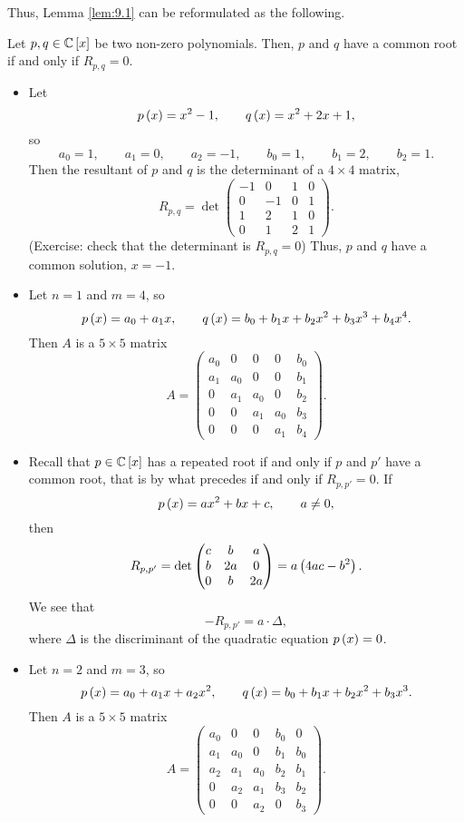 Thus, Lemma \ref{lem:9.1} can be reformulated as the following.

\begin{theorem}
\label{thm:9.3}
Let $ p, q \in \mathbb{C}\left[ x \right] $ be two non-zero polynomials. Then, $ p $ and $ q $ have a common root if and only if $ R_{p, q} = 0 $.
\end{theorem}

\begin{example}
\hfill
\begin{itemize}
\item Let
$$ p\left( x \right) = x^2 - 1, \qquad q\left( x \right) = x^2 + 2x + 1, $$
so
$$ a_0 = 1, \qquad a_1 = 0, \qquad a_2 = -1, \qquad b_0 = 1, \qquad b_1 = 2, \qquad b_2 = 1. $$
Then the resultant of $ p $ and $ q $ is the determinant of a $ 4 \times 4 $ matrix,
$$ R_{p, q} = \det
\begin{pmatrix}
-1 & 0 & 1 & 0 \\
0 & -1 & 0 & 1 \\
1 & 2 & 1 & 0 \\
0 & 1 & 2 & 1
\end{pmatrix}.
$$
(Exercise: check that the determinant is $ R_{p, q} = 0 $) Thus, $ p $ and $ q $ have a common solution, $ x = -1 $.
\item Let $ n = 1 $ and $ m = 4 $, so
$$ p\left( x \right) = a_0 + a_1x, \qquad q\left( x \right) = b_0 + b_1x + b_2x^2 + b_3x^3 + b_4x^4. $$
Then $ A $ is a $ 5 \times 5 $ matrix
$$ A =
\begin{pmatrix}
a_0 & 0 & 0 & 0 & b_0 \\
a_1 & a_0 & 0 & 0 & b_1 \\
0 & a_1 & a_0 & 0 & b_2 \\
0 & 0 & a_1 & a_0 & b_3 \\
0 & 0 & 0 & a_1 & b_4
\end{pmatrix}.
$$
\item Recall that $ p \in \mathbb{C}\left[ x \right] $ has a repeated root if and only if $ p $ and $ p' $ have a common root, that is by what precedes if and only if $ R_{p, p'} = 0 $. If
$$ p\left( x \right) = ax^2 + bx + c, \qquad a \ne 0, $$
then
$$ R_{p, p'} = \det\begin{pmatrix} c & b & a \\ b & 2a & 0 \\ 0 & b & 2a \end{pmatrix} = a\left( 4ac - b^2 \right). $$
We see that
$$ -R_{p, p'} = a \cdot \Delta, $$
where $ \Delta $ is the discriminant of the quadratic equation $ p\left( x \right) = 0 $.
\item Let $ n = 2 $ and $ m = 3 $, so
$$ p\left( x \right) = a_0 + a_1x + a_2x^2, \qquad q\left( x \right) = b_0 + b_1x + b_2x^2 + b_3x^3. $$
Then $ A $ is a $ 5 \times 5 $ matrix
$$ A =
\begin{pmatrix}
a_0 & 0 & 0 & b_0 & 0 \\
a_1 & a_0 & 0 & b_1 & b_0 \\
a_2 & a_1 & a_0 & b_2 & b_1 \\
0 & a_2 & a_1 & b_3 & b_2 \\
0 & 0 & a_2 & 0 & b_3
\end{pmatrix}.
$$
\end{itemize}
\end{example}

